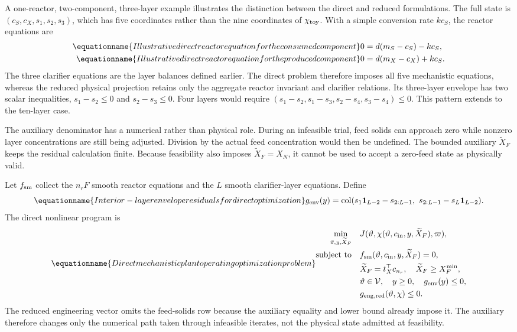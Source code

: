 A one-reactor, two-component, three-layer example illustrates the distinction between the direct and reduced formulations. The full state is $(c_S,c_X,s_1,s_2,s_3)$, which has five coordinates rather than the nine coordinates of $\chi_{\rm toy}$. With a simple conversion rate $kc_S$, the reactor equations are
\begin{align}
\equationname{Illustrative direct reactor equation for the consumed component}
0&=d(m_S-c_S)-kc_S,\\
\equationname{Illustrative direct reactor equation for the produced component}
0&=d(m_X-c_X)+kc_S.
\end{align}
The three clarifier equations are the layer balances defined earlier. The direct problem therefore imposes all five mechanistic equations, whereas the reduced physical projection retains only the aggregate reactor invariant and clarifier relations. Its three-layer envelope has two scalar inequalities, $s_1-s_2\le0$ and $s_2-s_3\le0$. Four layers would require $(s_1-s_2,s_1-s_3,s_2-s_4,s_3-s_4)\le0$. This pattern extends to the ten-layer case.

The auxiliary denominator has a numerical rather than physical role. During an infeasible trial, feed solids can approach zero while nonzero layer concentrations are still being adjusted. Division by the actual feed concentration would then be undefined. The bounded auxiliary $\widetilde X_F$ keeps the residual calculation finite. Because feasibility also imposes $\widetilde X_F=X_N$, it cannot be used to accept a zero-feed state as physically valid.

Let $f_{\rm sm}$ collect the $n_rF$ smooth reactor equations and the $L$ smooth clarifier-layer equations. Define
\begin{equation}
\equationname{Interior-layer envelope residuals for direct optimization}
g_{\rm env}(y)=\operatorname{col}
(s_1\mathbf1_{L-2}-s_{2:L-1},\ s_{2:L-1}-s_L\mathbf1_{L-2}).
\end{equation}
The direct nonlinear program is
\begin{equation}
\equationname{Direct mechanistic plant operating optimization problem}
\begin{aligned}
\min_{\vartheta,y,\widetilde X_F}\quad&J(\vartheta,\chi(\vartheta,c_{\rm in},y,\widetilde X_F),\varpi),\\
\text{subject to}\quad&f_{\rm sm}(\vartheta,c_{\rm in},y,\widetilde X_F)=0,\\
&\widetilde X_F=t_X^\top c_{n_r},\quad\widetilde X_F\ge X_F^{\min},\\
&\vartheta\in\mathcal V,\quad y\ge0,\quad g_{\rm env}(y)\le0,\\
&g_{{\rm eng},\rm red}(\vartheta,\chi)\le0.
\end{aligned}
\label{eq:plant_direct_optimization}
\end{equation}
The reduced engineering vector omits the feed-solids row because the auxiliary equality and lower bound already impose it. The auxiliary therefore changes only the numerical path taken through infeasible iterates, not the physical state admitted at feasibility.

